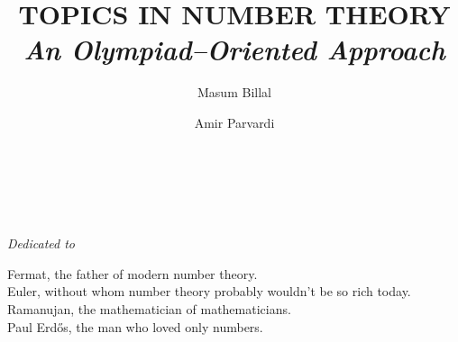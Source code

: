 \documentclass[leqno,12pt]{book}
\title{\bf\Huge TOPICS IN NUMBER THEORY\\ {\vspace*{.3in}\it\LARGE An Olympiad--Oriented Approach}\\\vspace*{.3in}{\Large Second Edition\\\vspace*{.1in}\rule{\textwidth}{0.8pt}}}
\author{
	\Huge Masum Billal
	\and \Huge Amir Parvardi
	\\\vspace*{.4in}
	\rule{\textwidth}{0.8pt}\\\vspace*{.2in}
}
\date{}
\begin{document}
\pagestyle{empty}
\maketitle
\pagestyle{empty}
\frontmatter

\begin{dedication}
	\begin{center}
		\textit{Dedicated to}
	\end{center}
	Fermat, the father of modern number theory.\\
	Euler, without whom number theory probably wouldn't be so rich today.\\
	Ramanujan, the mathematician of mathematicians.\\
	Paul Erd\H{o}s, the man who loved only numbers.
\end{dedication}
\end{document}
